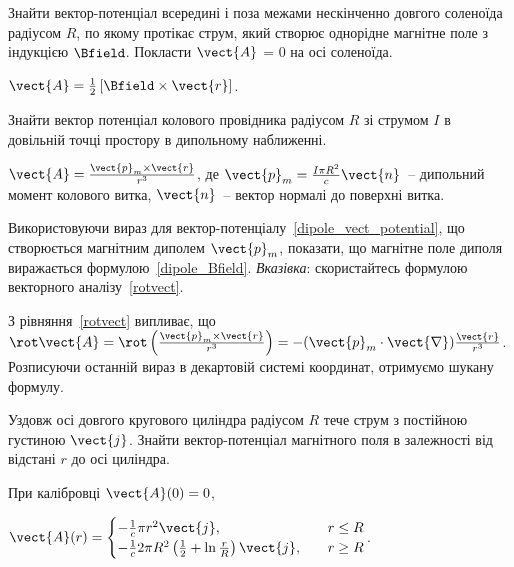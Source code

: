 \begin{problem}
Знайти вектор-потенціал всередині і поза межами нескінченно довгого  соленоїда радіусом $R$, по якому протікає струм, який створює  однорідне магнітне поле з індукцією $\Bfield$. Покласти $\vect{A}$ = 0 на осі соленоїда.
\begin{solution}
	$\vect{A} = \frac12 \left[ \Bfield\times \vect{r} \right] $.
\end{solution}
\end{problem}

\begin{problem}
    Знайти вектор потенціал колового провідника радіусом $R$ зі струмом $I$ в довільній точці простору в дипольному наближенні.
\begin{solution}
	$\vect{A} = \frac{\vect{p}_m\times\vect{r}}{r^3}$, де $\vect{p}_m = \frac{I\pi R^2}{c}\vect{n}$~-- дипольний момент колового витка, $\vect{n}$~-- вектор нормалі до поверхні витка.
\end{solution}
\end{problem}


\begin{problem}
Використовуючи вираз для вектор-потенціалу~\eqref{dipole_vect_potential}, що створюється магнітним диполем $\vect{p}_m$, показати, що магнітне поле диполя виражається формулою~\eqref{dipole_Bfield}.
\emph{Вказівка}: скористайтесь формулою векторного аналізу~\eqref{rotvect}.
\begin{solution}
	З рівняння~\eqref{rotvect} випливає, що $\rot\vect{A} = \rot\left( \frac{\vect{p}_m\times\vect{r}}{r^3}\right)  = -(\vect{p}_m\cdot\vect{\nabla}) \frac{\vect{r}}{r^3}$.
	Розписуючи останній вираз  в декартовій системі координат, отримуємо шукану формулу.
\end{solution}
\end{problem}


\begin{problem}
Уздовж осі довгого кругового циліндра радіусом $R$ тече струм з постійною густиною $\vect{j}$. Знайти вектор-потенціал магнітного поля в залежності від відстані $r$ до осі циліндра.
\begin{solution}
	При калібровці $\vect{A}(0) = 0$,

	$
		\vect{A}(r) = %
		\begin{cases}
			-\frac{1}{c}\pi r^2\vect{j},                                          & \quad r \le R \\
			-\frac{1}{c}2\pi R^2\left( \frac12 + \ln\frac{r}{R}\right) \vect{j} , & \quad r \ge R
		\end{cases}
	$.
\end{solution}
\end{problem}


